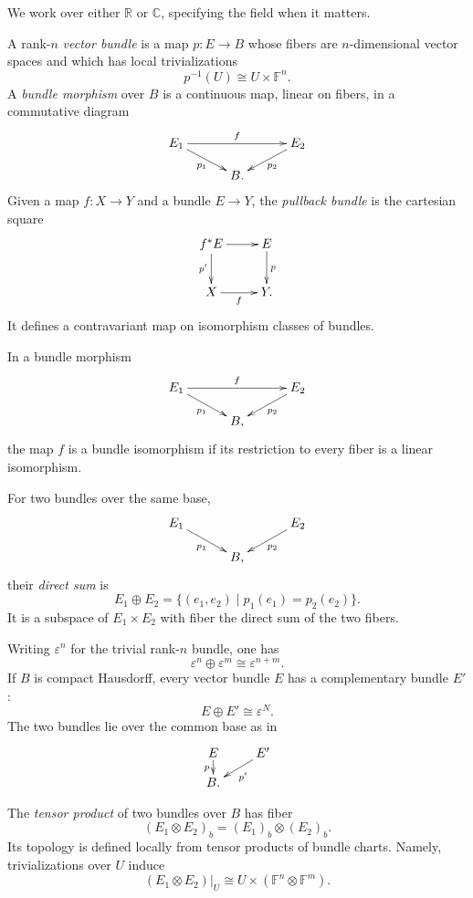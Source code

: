 We work over either $\mathbb{R}$ or
$\mathbb{C}$, specifying the field when it
matters.

\begin{definition}
\label{at-definition-vector-bundle}
A rank-$n$ \emph{vector bundle} is a map
$p:E\longrightarrow B$ whose fibers are
$n$-dimensional vector spaces and which has
local trivializations
$$
p^{-1}(U)\cong U\times\mathbb{F}^n.
$$
A \emph{bundle morphism} over $B$ is a
continuous map, linear on fibers, in a
commutative diagram
$$
\xymatrix@C=30pt@R=12pt{
E_1\ar[rr]^f\ar[dr]_{p_1}&&
E_2\ar[dl]^{p_2}\\
&B.&
}
$$
Given a map $f:X\longrightarrow Y$ and a
bundle $E\longrightarrow Y$, the
\emph{pullback bundle} is the cartesian
square
$$
\xymatrix{
f^*E\ar[r]\ar[d]_{p'}&E\ar[d]^p\\
X\ar[r]_f&Y.
}
$$
It defines a contravariant map on isomorphism
classes of bundles.
\end{definition}

\begin{lemma}
\label{at-lemma-fiberwise-bundle-isomorphism}
In a bundle morphism
$$
\xymatrix@C=30pt@R=12pt{
E_1\ar[rr]^f\ar[dr]_{p_1}&&
E_2\ar[dl]^{p_2}\\
&B,&
}
$$
the map $f$ is a bundle isomorphism if its
restriction to every fiber is a linear
isomorphism.
\end{lemma}

\begin{definition}
\label{at-definition-bundle-direct-sum}
For two bundles over the same base,
$$
\xymatrix@C=30pt@R=12pt{
E_1\ar[dr]_{p_1}&&E_2\ar[dl]^{p_2}\\
&B,&
}
$$
their \emph{direct sum} is
$$
E_1\oplus E_2
=\{(e_1,e_2)\mid p_1(e_1)=p_2(e_2)\}.
$$
It is a subspace of $E_1\times E_2$ with
fiber the direct sum of the two fibers.
\end{definition}

\begin{remark}
\label{at-remark-bundle-complements}
Writing $\varepsilon^n$ for the trivial
rank-$n$ bundle, one has
$$
\varepsilon^n\oplus\varepsilon^m
\cong\varepsilon^{n+m}.
$$
If $B$ is compact Hausdorff, every vector
bundle $E$ has a complementary bundle $E'$:
$$
E\oplus E'\cong\varepsilon^N.
$$
The two bundles lie over the common base as
in
$$
\xymatrix@C=22pt@R=10pt{
E\ar[d]_p&E'\ar[dl]^{p'}\\
B.&
}
$$
\end{remark}

\begin{definition}
\label{at-definition-bundle-tensor-product}
The \emph{tensor product} of two bundles over
$B$ has fiber
$$
(E_1\otimes E_2)_b
=(E_1)_b\otimes(E_2)_b.
$$
Its topology is defined locally from tensor
products of bundle charts.  Namely,
trivializations over $U$ induce
$$
(E_1\otimes E_2)|_U
\cong U\times
(\mathbb{F}^n\otimes\mathbb{F}^m).
$$
\end{definition}

